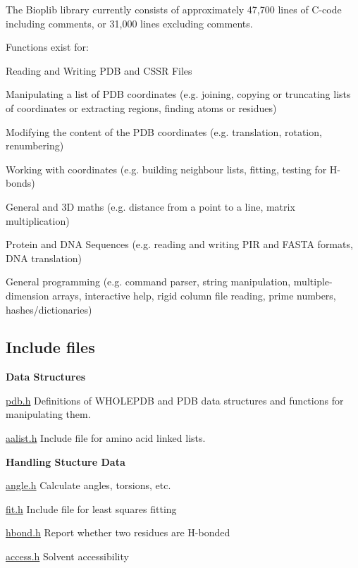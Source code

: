 The Bioplib library currently consists of approximately 47,700 lines of C-\/code including comments, or 31,000 lines excluding comments.

Functions exist for\-:
\begin{DoxyItemize}
\item Reading and Writing P\-D\-B and C\-S\-S\-R Files
\item Manipulating a list of P\-D\-B coordinates (e.\-g. joining, copying or truncating lists of coordinates or extracting regions, finding atoms or residues)
\item Modifying the content of the P\-D\-B coordinates (e.\-g. translation, rotation, renumbering)
\item Working with coordinates (e.\-g. building neighbour lists, fitting, testing for H-\/bonds)
\item General and 3\-D maths (e.\-g. distance from a point to a line, matrix multiplication)
\item Protein and D\-N\-A Sequences (e.\-g. reading and writing P\-I\-R and F\-A\-S\-T\-A formats, D\-N\-A translation)
\item General programming (e.\-g. command parser, string manipulation, multiple-\/dimension arrays, interactive help, rigid column file reading, prime numbers, hashes/dictionaries)
\end{DoxyItemize}

\subsection*{Include files }

{\bfseries Data Structures}
\begin{DoxyItemize}
\item \hyperlink{pdb_8h}{pdb.\-h} Definitions of W\-H\-O\-L\-E\-P\-D\-B and P\-D\-B data structures and functions for manipulating them.
\item \hyperlink{aalist_8h}{aalist.\-h} Include file for amino acid linked lists.
\end{DoxyItemize}

{\bfseries Handling Stucture Data}
\begin{DoxyItemize}
\item \hyperlink{angle_8h}{angle.\-h} Calculate angles, torsions, etc.
\item \hyperlink{fit_8h}{fit.\-h} Include file for least squares fitting
\item \hyperlink{hbond_8h}{hbond.\-h} Report whether two residues are H-\/bonded
\item \hyperlink{access_8h}{access.\-h} Solvent accessibility
\end{DoxyItemize}

